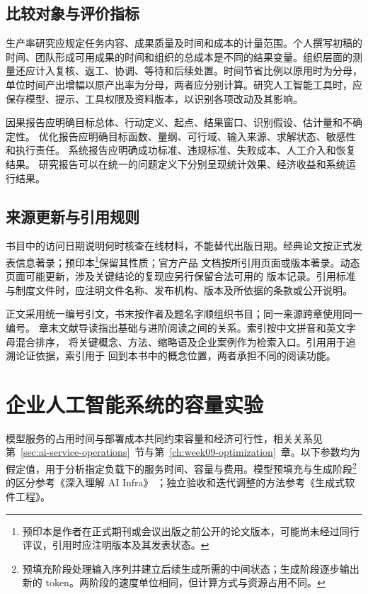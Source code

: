 \section{比较对象与评价指标}

生产率研究应规定任务内容、成果质量及时间和成本的计量范围。个人撰写初稿的时间、团队形成可用成果的时间和组织的总成本是不同的结果变量。组织层面的测量还应计入复核、返工、协调、等待和后续处置。时间节省比例以原用时为分母，单位时间产出增幅以原产出率为分母，两者应分别计算。研究人工智能工具时，应保存模型、提示、工具权限及资料版本，以识别各项改动及其影响。

因果报告应明确目标总体、行动定义、起点、结果窗口、识别假设、估计量和不确定性。
优化报告应明确目标函数、量纲、可行域、输入来源、求解状态、敏感性和执行责任。
系统报告应明确成功标准、违规标准、失败成本、人工介入和恢复结果。
研究报告可以在统一的问题定义下分别呈现统计效果、经济收益和系统运行结果。

\section{来源更新与引用规则}
书目中的访问日期说明何时核查在线材料，不能替代出版日期。经典论文按正式发表信息著录；预印本\footnote{预印本是作者在正式期刊或会议出版之前公开的论文版本，可能尚未经过同行评议，引用时应注明版本及其发表状态。}保留其性质；官方产品
文档按所引用页面或版本著录。动态页面可能更新，涉及关键结论的复现应另行保留合法可用的
版本记录。引用标准与制度文件时，应注明文件名称、发布机构、版本及所依据的条款或公开说明。

正文采用统一编号引文，书末按作者及题名字顺组织书目；同一来源跨章使用同一编号。
章末文献导读指出基础与进阶阅读之间的关系。索引按中文拼音和英文字母混合排序，
将关键概念、方法、缩略语及企业案例作为检索入口。引用用于追溯论证依据，索引用于
回到本书中的概念位置，两者承担不同的阅读功能。

\chapter{企业人工智能系统的容量实验}
\label{app:ai-infra-lab}

模型服务的占用时间与部署成本共同约束容量和经济可行性，相关关系见
第~\ref{sec:ai-service-operations}~节与第~\ref{ch:week09-optimization}~章。以下参数均为
假定值，用于分析指定负载下的服务时间、容量与费用。模型预填充与生成阶段\footnote{预填充阶段处理输入序列并建立后续生成所需的中间状态；生成阶段逐步输出新的 token。两阶段的速度单位相同，但计算方式与资源占用不同。}的区分参考《深入理解 AI Infra》
\cite{aiinfra2026}；独立验收和迭代调整的方法参考《生成式软件工程》\cite{gse2026}。

